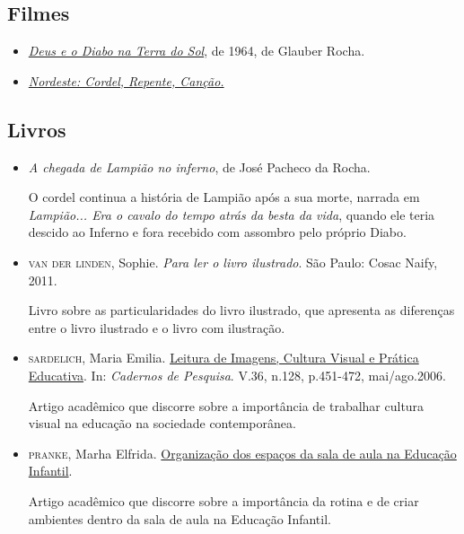 \documentclass[11pt]{extarticle}
\begin{document}
\subsection{Filmes}

\begin{itemize}

	\item \href{https://www.youtube.com/watch?v=RyTnX_yl1bw}{\textit{Deus e o Diabo na Terra do Sol}}, de 1964, de Glauber Rocha. 

	\item \href{https://www.youtube.com/watch?v=xFOZxwBcUmo}{\textit{Nordeste: Cordel, Repente, Canção.}} 

\end{itemize}

\subsection{Livros}

\begin{itemize}
	\item \textit{A chegada de Lampião no inferno}, de José Pacheco da Rocha. 

O cordel continua a história de Lampião após a sua morte, narrada em \textit{Lampião... Era o cavalo do tempo atrás da besta da vida}, quando ele teria descido ao Inferno e fora recebido com assombro pelo próprio Diabo. 

	\item \textsc{van der linden}, Sophie. \textit{Para ler o livro ilustrado}. São Paulo: Cosac Naify, 2011.

Livro sobre as particularidades do livro ilustrado, que apresenta as diferenças entre o livro ilustrado e o livro com ilustração. 
\end{itemize}

\begin{itemize}
\item \textsc{sardelich}, Maria Emilia. \href{https://www.scielo.br/pdf/cp/v36n128/v36n128a09}{Leitura de Imagens, Cultura Visual e Prática Educativa}. 
In: \textit{Cadernos de Pesquisa}. V.36, n.128, p.451-472, mai/ago.2006.  


Artigo acadêmico que discorre sobre a importância de trabalhar cultura 
visual na educação na sociedade contemporânea. 

\item {\textsc{pranke}}, Marha Elfrida. \href{http://centraldeinteligenciaacademica.blogspot.com/2016/04/organizacao-dos-espacos-da-sala-de-aula.html}{Organização dos espaços da sala de aula na Educação Infantil}. 

Artigo acadêmico que discorre sobre a importância da rotina e de criar ambientes dentro da sala de aula na Educação Infantil.  
\end{itemize}
\end{document}
